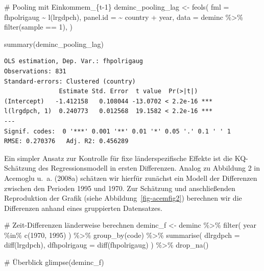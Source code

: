 \documentclass[
  a4paper,
  DIV=11,
  oneside]{scrreprt}
\newenvironment{Shaded}{\begin{snugshade}}{\end{snugshade}}
\newcommand{\AttributeTok}[1]{\textcolor[rgb]{0.40,0.45,0.13}{#1}}
\newcommand{\CommentTok}[1]{\textcolor[rgb]{0.37,0.37,0.37}{#1}}
\newcommand{\DecValTok}[1]{\textcolor[rgb]{0.68,0.00,0.00}{#1}}
\newcommand{\FunctionTok}[1]{\textcolor[rgb]{0.28,0.35,0.67}{#1}}
\newcommand{\NormalTok}[1]{\textcolor[rgb]{0.00,0.23,0.31}{#1}}
\newcommand{\OtherTok}[1]{\textcolor[rgb]{0.00,0.23,0.31}{#1}}
\newcommand{\SpecialCharTok}[1]{\textcolor[rgb]{0.37,0.37,0.37}{#1}}
\begin{document}
\begin{Shaded}
\begin{Highlighting}[]
\CommentTok{\# Pooling mit Einkommem\_\{t{-}1\}}
\NormalTok{deminc\_pooling\_lag }\OtherTok{\textless{}{-}} \FunctionTok{feols}\NormalTok{(}
  \AttributeTok{fml =}\NormalTok{ fhpolrigaug }\SpecialCharTok{\textasciitilde{}} \FunctionTok{l}\NormalTok{(lrgdpch),}
  \AttributeTok{panel.id =} \SpecialCharTok{\textasciitilde{}}\NormalTok{ country }\SpecialCharTok{+}\NormalTok{ year,}
  \AttributeTok{data =}\NormalTok{ deminc }\SpecialCharTok{\%\textgreater{}\%} 
    \FunctionTok{filter}\NormalTok{(sample }\SpecialCharTok{==} \DecValTok{1}\NormalTok{), }
\NormalTok{)}

\FunctionTok{summary}\NormalTok{(deminc\_pooling\_lag)}
\end{Highlighting}
\end{Shaded}

\begin{verbatim}
OLS estimation, Dep. Var.: fhpolrigaug
Observations: 831
Standard-errors: Clustered (country) 
               Estimate Std. Error  t value  Pr(>|t|)    
(Intercept)   -1.412158   0.108044 -13.0702 < 2.2e-16 ***
l(lrgdpch, 1)  0.240773   0.012568  19.1582 < 2.2e-16 ***
---
Signif. codes:  0 '***' 0.001 '**' 0.01 '*' 0.05 '.' 0.1 ' ' 1
RMSE: 0.270376   Adj. R2: 0.456289
\end{verbatim}

Ein simpler Ansatz zur Kontrolle für fixe länderspezifische Effekte ist
die KQ-Schätzung des Regressionsmodell in ersten Differenzen. Analog zu
Abbildung 2 in Acemoglu u.~a. (2008a) schätzen wir hierfür zunächst ein
Modell der Differenzen zwischen den Perioden 1995 und 1970. Zur
Schätzung und anschließenden Reproduktion der Grafik (siehe
Abbildung~\ref{fig-acemfig2}) berechnen wir die Differenzen anhand eines
gruppierten Datensatzes.

\begin{Shaded}
\begin{Highlighting}[]
\CommentTok{\# Zeit{-}Differenzen länderweise berechnen}
\NormalTok{deminc\_f }\OtherTok{\textless{}{-}}\NormalTok{ deminc }\SpecialCharTok{\%\textgreater{}\%}
  \FunctionTok{filter}\NormalTok{(}
\NormalTok{    year }\SpecialCharTok{\%in\%} \FunctionTok{c}\NormalTok{(}\DecValTok{1970}\NormalTok{, }\DecValTok{1995}\NormalTok{)}
\NormalTok{  ) }\SpecialCharTok{\%\textgreater{}\%}
  \FunctionTok{group\_by}\NormalTok{(code) }\SpecialCharTok{\%\textgreater{}\%}
  \FunctionTok{summarise}\NormalTok{(}
    \AttributeTok{dlrgdpch =} \FunctionTok{diff}\NormalTok{(lrgdpch),}
    \AttributeTok{dfhpolrigaug =} \FunctionTok{diff}\NormalTok{(fhpolrigaug)}
\NormalTok{    ) }\SpecialCharTok{\%\textgreater{}\%}
  \FunctionTok{drop\_na}\NormalTok{()}

\CommentTok{\# Überblick}
\FunctionTok{glimpse}\NormalTok{(deminc\_f)}
\end{Highlighting}
\end{Shaded}
\end{document}
